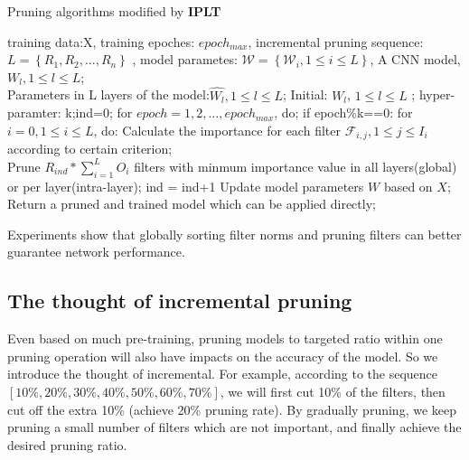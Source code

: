 \documentclass[runningheads]{llncs}
\begin{document}
\begin{algorithm}[htb]
  \caption{Pruning algorithms modified by \textbf{IPLT}}
  \label{alg:global}
  \begin{algorithmic}[1]
    \Require
      training data:X, training epoches: $epoch_{max}$,
      incremental pruning sequence: $L = \left\{R_1, R_2, ..., R_n\right\}$ ,
      model parametes: $\mathcal{W} = \left\{\mathcal{W}_i , 1\leq i \leq L \right\}$,
      A CNN model, ${W_l,1\leq l\leq L}$;\\
    \Ensure
      Parameters in L layers of the model:${\hat{W_l}, 1\leq l\leq L}$;
    \State Initial: ${W_l}$, ${1\leq l\leq L}$ ; hyper-paramter: k;ind=0;
    \label{code:fram:extract}
    \State for ${epoch=1, 2, \ldots, epoch_{max}}$, do;
    \label{code:fram:trainbase}
    \State \qquad if epoch\%k==0:
    \label{code:fram:add}
    \State \qquad \qquad for $i=0, 1\leq i\leq L$, do:
    \label{code:fram:classify}
    \State \qquad \qquad \qquad Calculate the importance for each filter $\mathcal{F}_{i,j}, 1\leq j \leq I_i$ according to certain criterion;
    \label{code:fram:select} \\
    \State \qquad \qquad  Prune $R_{ind}\ast\sum_{i=1}^LO_i$ filters with minmum importance value in all layers(global) or per layer(intra-layer);
    \State \qquad \qquad ind = ind+1
    \label{code:fram:classify}
    \State \qquad Update model parameters $W$ based on $X$;
    \label{code:fram:add}
    \label{code:fram:select}
    \State Return a pruned and trained model which can be applied directly;
  \end{algorithmic}
\end{algorithm}

Experiments show that globally sorting filter norms and pruning filters can better guarantee network performance.

\subsection{The thought of incremental pruning}
Even based on much pre-training, pruning models to targeted ratio within one pruning operation will also have impacts on the accuracy of the model. So we introduce the thought of incremental. For example, according to the sequence $[10\%, 20\%, 30\%, 40\%, 50\%, 60\%, 70\%]$, we will first cut 10\% of the filters, then cut off the extra 10\% (achieve 20\% pruning rate). By gradually pruning, we keep pruning a small number of filters which are not important, and finally achieve the desired pruning ratio.
\end{document}
